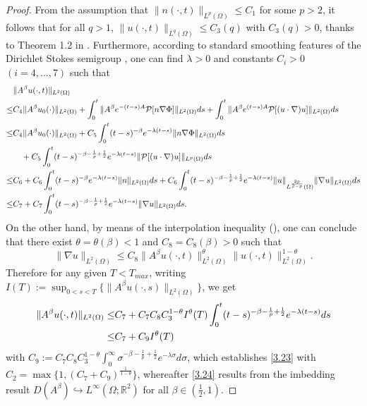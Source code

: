 \documentclass[12pt]{article}
\theoremstyle{plain}
\theoremstyle{definition}
\numberwithin{equation}{section}
\begin{document}
\begin{proof} From the assumption that $\|n(\cdot,t)\|_{L^p(\Omega)} \leq C_1$ for some $p>2$, it follows that for
all $q>1$,  $\|u(\cdot,t)\|_{L^q(\Omega)} \leq C_3(q)$ with $C_3(q)>0$, thanks to Theorem 1.2 in \cite{Fuest}.  Furthermore,
according to standard smoothing features of the Dirichlet Stokes semigroup \cite[p.~201]{Friedman}, one can find $\lambda>0$ and constants
$C_i>0$ $(i=4,\ldots,7)$ such that
\begin{align*}
&\|A^\beta u(\cdot,t)\|_{L^2(\Omega)}\notag\\
\leq & C_4
\|A^\beta  u_0(\cdot)\|_{L^2(\Omega)}
+\int_{0}^t
\|A^\beta e^{-(t-s)A}
\mathcal{P}[n\nabla\Phi]\|_{L^2(\Omega)}ds
+\int_{0}^t
\|A^\beta e^{(t-s)A}
\mathcal{P}[(u\cdot\nabla)u]\|_{L^2(\Omega)}ds\\
\leq &C_4
\|A^\beta  u_0(\cdot)\|_{L^2(\Omega)}
+C_5\int_{0}^t (t-s)^{-\beta}
e^{-\lambda(t-s)}
\|n\nabla\Phi\|_{L^2(\Omega)}ds \notag\\
&\quad+C_5\int_{0}^t(t-s)^{-\beta-\frac 1p+\frac 12}
e^{-\lambda(t-s)}
\|\mathcal{P}[(u\cdot\nabla)u]\|_{L^p(\Omega)}ds \notag\\
\leq & C_6
+C_6\int_{0}^t(t-s)^{-\beta}
e^{-\lambda(t-s)}\|n\|_{L^2(\Omega)}ds +C_6\int_{0}^t(t-s)^{-\beta-\frac 1p+\frac 12}
e^{-\lambda(t-s)}\|u\|_{L^{\frac{2p}{2-p}}(\Omega)}\|\nabla u\|_{L^2(\Omega)}ds\\
\leq & C_7+C_7 \int_{0}^t(t-s)^{-\beta-\frac 1p+\frac 12}
e^{-\lambda(t-s)}\|\nabla u\|_{L^2(\Omega)}ds . \notag
\end{align*}
 On the other hand, by means of the
interpolation inequality (\cite[Theorem 14.1]{Friedman}), one can conclude that there exist $\theta=\theta(\beta)<1$ and $C_8=C_8(\beta)>0$ such that
$$\|\nabla u\|_{L^2(\Omega)}\leq C_8 \|A^\beta u(\cdot,t)\|^{\theta}_{L^2(\Omega)}  \|u(\cdot,t)\|^{1-\theta}_{L^2(\Omega)}.
$$
Therefore for any given $T<T_{max}$,  writing $I(T):=\displaystyle\sup_{0<s<T}\{ \|A^\beta u(\cdot,s)\|_{L^2(\Omega)}\}$, we get
\begin{align}
\|A^\beta u(\cdot,t)\|_{L^2(\Omega)}
\leq & C_7+C_7C_8C_3^{1-\theta} I^{\theta}(T)\int_{0}^t(t-s)^{-\beta-\frac 1p+\frac 12}
e^{-\lambda(t-s)} ds\notag \\
\leq &  C_7+C_9 I^{\theta}(T)
\end{align}
with $C_9:=C_7C_8C_3^{1-\theta} \int_{0}^{\infty}\sigma^{-\beta-\frac 1p+\frac 12}e^{-\lambda \sigma} d\sigma$,
which establishes \eqref{3.23} with $C_2=\max\{1, (C_7+C_9)^{\frac1{1-\theta}} \}$, whereafter \eqref{3.24} results from
the imbedding result $D(A^\beta) \hookrightarrow L^\infty(\Omega;\mathbb{R}^2)$ for all $\beta\in (\frac 12,1)$.
\end{proof}
\end{document}
